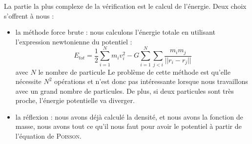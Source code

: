 La partie la plus complexe de la vérification est le calcul de l'énergie. Deux
choix s'offrent à nous :
\begin{itemize}
	\item la méthode force brute : nous calculons l'énergie totale en utilisant
		l'expression newtonienne du potentiel :
		$$
			E_{tot} = \frac{1}{2}\sum_{i = 1}^{N} m_i v_i^2 - G \sum_{i = 1}^{N} \sum_{j < i} \dfrac{m_i m_j}{|| r_i - r_j ||}
		$$
		avec $N$ le nombre de particule Le problème de cette méthode est qu'elle nécessite $N^2$
	opérations et n'est donc pas intéressante lorsque nous travaillons avec un grand
	nombre de particules. De plus, si deux particules sont très proche,
	l'énergie potentielle va diverger.
	\item la réflexion : nous avons déjà calculé la densité, et nous avons
		la fonction de masse, nous avons tout ce qu'il nous faut pour
		avoir le potentiel à partir de l'équation de \textsc{Poisson}.
\end{itemize}


